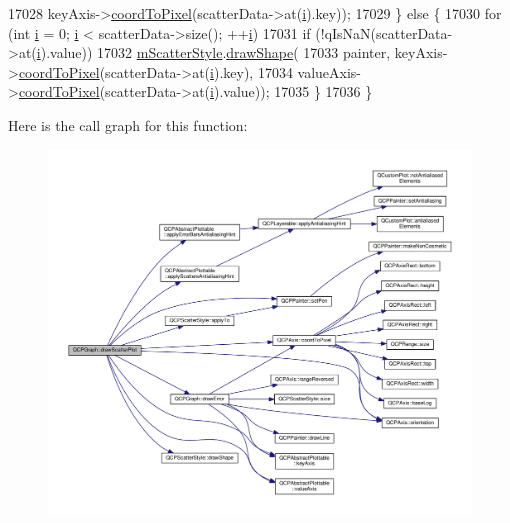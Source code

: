 \begin{DoxyCode}
17028             keyAxis->\hyperlink{class_q_c_p_axis_a985ae693b842fb0422b4390fe36d299a}{coordToPixel}(scatterData->at(\hyperlink{_comparision_pictures_2_createtest_image_8m_a6f6ccfcf58b31cb6412107d9d5281426}{i}).key));
17029   \} \textcolor{keywordflow}{else} \{
17030     \textcolor{keywordflow}{for} (\textcolor{keywordtype}{int} \hyperlink{_comparision_pictures_2_createtest_image_8m_a6f6ccfcf58b31cb6412107d9d5281426}{i} = 0; \hyperlink{_comparision_pictures_2_createtest_image_8m_a6f6ccfcf58b31cb6412107d9d5281426}{i} < scatterData->size(); ++\hyperlink{_comparision_pictures_2_createtest_image_8m_a6f6ccfcf58b31cb6412107d9d5281426}{i})
17031       \textcolor{keywordflow}{if} (!qIsNaN(scatterData->at(\hyperlink{_comparision_pictures_2_createtest_image_8m_a6f6ccfcf58b31cb6412107d9d5281426}{i}).value))
17032         \hyperlink{class_q_c_p_graph_a4aa36241f166ccd1f75fc8f24e4a3247}{mScatterStyle}.\hyperlink{class_q_c_p_scatter_style_a992d531ac471ec2b29bdec6aeb400a06}{drawShape}(
17033             painter, keyAxis->\hyperlink{class_q_c_p_axis_a985ae693b842fb0422b4390fe36d299a}{coordToPixel}(scatterData->at(\hyperlink{_comparision_pictures_2_createtest_image_8m_a6f6ccfcf58b31cb6412107d9d5281426}{i}).key),
17034             valueAxis->\hyperlink{class_q_c_p_axis_a985ae693b842fb0422b4390fe36d299a}{coordToPixel}(scatterData->at(\hyperlink{_comparision_pictures_2_createtest_image_8m_a6f6ccfcf58b31cb6412107d9d5281426}{i}).value));
17035   \}
17036 \}
\end{DoxyCode}


Here is the call graph for this function\+:\nopagebreak
\begin{figure}[H]
\begin{center}
\leavevmode
\includegraphics[width=350pt]{class_q_c_p_graph_a6bdc385b122ce06134d4196373ae2250_cgraph}
\end{center}
\end{figure}




